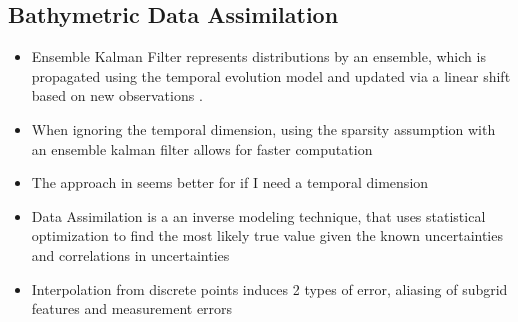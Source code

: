 \restoregeometry

\subsection{Bathymetric Data Assimilation}

\begin{itemize}
      \color{blue}
      \item Ensemble Kalman Filter represents distributions by an ensemble, which is propagated using the temporal evolution model and updated via a linear shift based on new observations \parencite{Jurek2021}.
      \item When ignoring the temporal dimension, using the sparsity assumption with an ensemble kalman filter allows for faster computation \parencite{Jurek2021}
      \item The approach in \citeauthor{Jurek2021} seems better for if I need a temporal dimension 
      \item Data Assimilation is a an inverse modeling technique, that uses statistical optimization to find the most likely true value given the known uncertainties and correlations in uncertainties \parencite{Salim2021}
      \item Interpolation from discrete points induces 2 types of error, aliasing of subgrid features and measurement errors \parencite{Plant2002}
   

\end{itemize}
